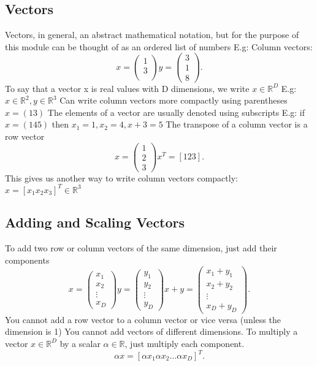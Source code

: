 \documentclass[a4paper]{article}
\newcommand{\R}{\mathbb{R}}
\newcommand{\0}{\mathbb{\emptyset}}
\begin{document}
	\subsection{Vectors}
	Vectors, in general, an abstract mathematical notation, but for the purpose of this module can be
	thought of as an ordered list of numbers
	E.g: Column vectors:
	\[
		x = \begin{pmatrix} 1\\ 3\\ \end{pmatrix} 
		y = \begin{pmatrix} 3\\ 1\\ 8 \end{pmatrix}
	.\]
	To say that a vector x is real values with D dimensions, we write $x \in \R^D$ 
	E.g: $x \in \R^2, y \in \R^3 $ 
	Can write column vectors more compactly using parentheses $x = (13)$ 
	The elements of a vector are usually denoted using subscripts
	E.g: if $x = (1 4 5)$ then $x_1 = 1, x_2 = 4, x+3 = 5$
	The transpose of a column vector is a row vector
	\[
		x = \begin{pmatrix} 1\\ 2\\ 3 \end{pmatrix}
		x^T = [1 2 3]
	.\]
	This gives us another way to write column vectors compactly:
	$x = [x_1 x_2 x_3]^T \in \R^3$
	\subsection{Adding and Scaling Vectors}
	To add two row or column vectors of the same dimension, just add their components
	\[
		x = \begin{pmatrix} x_1\\ x_2 \\ \vdots\\ x_D \end{pmatrix} 
		y = \begin{pmatrix} y_1\\ y_2 \\ \vdots\\ y_D \end{pmatrix}
		x+y = \begin{pmatrix} x_1+y_1 \\ x_2 +y_2 \\ \vdots\\ x_D+y_D \end{pmatrix}
	.\]
	You cannot add a row vector to a column vector or vice versa (unless the dimension is 1)
	You cannot add vectors of different dimensions.
	To multiply a vector $x \in \R^D$ by a scalar $\alpha \in \R$, just multiply each component.
	\[
		\alpha x = [\alpha x_1 \alpha x_2 \ldots \alpha x_D]^T
	.\]
\end{document}

